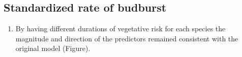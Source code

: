 \documentclass{article}\usepackage[]{graphicx}\usepackage[]{color}
\begin{document}
\subsection*{Standardized rate of budburst}
\begin{enumerate}

\item By having different durations of vegetative risk for each species the magnitude and direction of the predictors remained consistent with the original model (Figure). %

\end{enumerate}  
  
  
\end{document}
